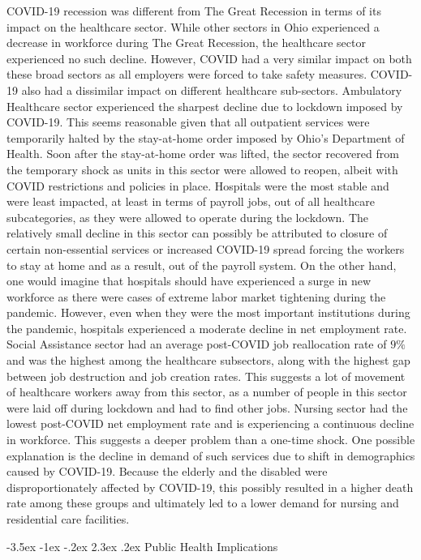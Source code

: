\documentclass[11pt]{article}
\makeatletter
\renewcommand\section{\@startsection {section}{1}{\z@}%
                                       {-3.5ex \@plus -1ex \@minus -.2ex}%
                                       {2.3ex \@plus.2ex}%
                                       {\normalfont\fontfamily{phv}\fontsize{16}{19}\bfseries}}
\makeatother
\begin{document}
COVID-19 recession was different from The Great Recession in terms of its impact on the healthcare sector. While other sectors in Ohio experienced a decrease in workforce during The Great Recession, the healthcare sector experienced no such decline. However, COVID had a very similar impact on both these broad sectors as all employers were forced to take safety measures.
COVID-19 also had a dissimilar impact on different healthcare sub-sectors.
Ambulatory Healthcare sector experienced the sharpest decline due to lockdown imposed by COVID-19. This seems reasonable given that all outpatient services were temporarily halted by the stay-at-home order imposed by Ohio’s Department of Health. Soon after the stay-at-home order was lifted, the sector recovered from the temporary shock as units in this sector were allowed to reopen, albeit with COVID restrictions and policies in place.
Hospitals were the most stable and were least impacted, at least in terms of payroll jobs, out of all healthcare subcategories, as they were allowed to operate during the lockdown. The relatively small decline in this sector can possibly be attributed to closure of certain non-essential services or increased COVID-19 spread forcing the workers to stay at home and as a result, out of the payroll system. On the other hand, one would imagine that hospitals should have experienced a surge in new workforce as there were cases of extreme labor market tightening during the pandemic. However, even when they were the most important institutions during the pandemic, hospitals experienced a moderate decline in net employment rate.
Social Assistance sector had an average post-COVID job reallocation rate of $9\%$ and was the highest among the healthcare subsectors, along with the highest gap between job destruction and job creation rates. This suggests a lot of movement of healthcare workers away from this sector, as a number of people in this sector were laid off during lockdown and had to find other jobs. 
Nursing sector had the lowest post-COVID net employment rate and is experiencing a continuous decline in workforce. This suggests a deeper problem than a one-time shock. One possible explanation is the decline in demand of such services due to shift in demographics caused by COVID-19. Because the elderly and the disabled were disproportionately affected by COVID-19, this possibly resulted in a higher death rate among these groups and ultimately led to a lower demand for nursing and residential care facilities. 


\section{Public Health Implications}\label{s:implications}
\end{document}
